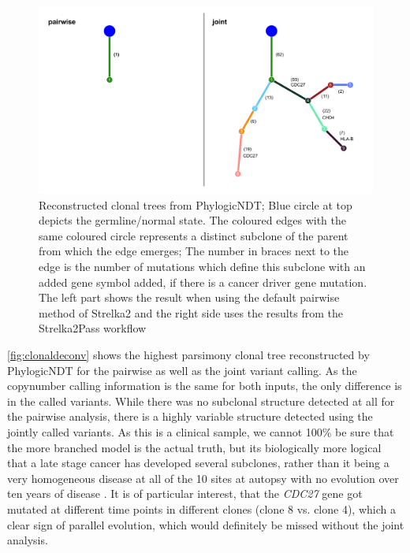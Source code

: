 \begin{figure}[!ht]
\centering
\includegraphics[width=.99\linewidth]{Figures/clonalDeconv.pdf}
\caption[Reconstructed clonal trees for joint and pairwise variant calling]{Reconstructed clonal trees from PhylogicNDT; Blue circle at top depicts the germline/normal state. The coloured edges with the same coloured circle represents a distinct subclone of the parent from which the edge emerges; The number in braces next to the edge is the number of mutations which define this subclone with an added gene symbol added, if there is a cancer driver gene mutation. The left part shows the result when using the default pairwise method of Strelka2 and the right side uses the results from the Strelka2Pass workflow}\label{fig:clonaldeconv}
\end{figure}


\autoref{fig:clonaldeconv} shows the highest parsimony clonal tree reconstructed by PhylogicNDT for the pairwise as well as the joint variant calling. As the copynumber calling information is the same for both inputs, the only difference is in the called variants. While there was no subclonal structure detected at all for the pairwise analysis, there is a highly variable structure detected using the jointly called variants. As this is a clinical sample, we cannot 100\% be sure that the more branched model is the actual truth, but its biologically more logical that a late stage cancer has developed several subclones, rather than it being a very homogeneous disease at all of the 10 sites at autopsy with no evolution over ten years of disease \cite{Gerstung2020}.
It is of particular interest, that the \textit{CDC27} gene got mutated at different time points in different clones (clone 8 vs. clone 4), which a clear sign of parallel evolution, which would definitely be missed without the joint analysis.


